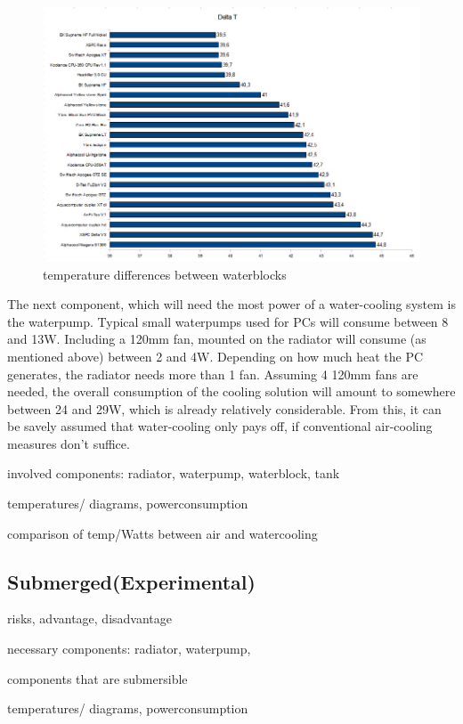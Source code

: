 \begin{figure}[H]
  \centering
  \includegraphics[width=.9\textwidth]{./graphics/waterblock_differences}
  \caption{temperature differences between waterblocks}
  \label{fig:waterblocks_diff}
\end{figure}
The next component, which will need the most power of a water-cooling system is the waterpump. Typical small waterpumps used for PCs will consume between 8 and 13W.
Including a 120mm fan, mounted on the radiator will consume (as mentioned above) between 2 and 4W. Depending on how much heat the PC generates, the radiator
needs more than 1 fan. Assuming 4 120mm fans are needed, the overall consumption of the cooling solution will amount to somewhere between 24 and 29W, which
is already relatively considerable. From this, it can be savely assumed that water-cooling only pays off, if conventional air-cooling measures don't suffice.
\begin{compactitem} 
\item involved components: radiator, waterpump, waterblock, tank 
\item temperatures/ diagrams, powerconsumption 
\item comparison of temp/Watts between air and watercooling
\end{compactitem}


\subsection{Submerged(Experimental)}

\begin{compactitem}
  \item risks, advantage, disadvantage 
  \item necessary components: radiator, waterpump, 
  \item components that are submersible 
  \item temperatures/ diagrams, powerconsumption
\end{compactitem}


